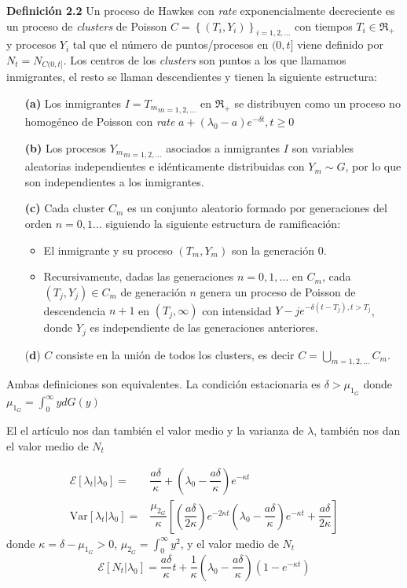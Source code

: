 \documentclass[a4paper,11pt]{book}
\begin{document}
\textbf{Definición 2.2} Un proceso de Hawkes con \textit{rate} exponencialmente decreciente es un proceso de \textit{clusters} de Poisson 
$C=\left\{ (T_i,Y_i) \right\}_{i=1,2,\ldots}$ con tiempos $T_i\in\Re_{+}$ y procesos $Y_i$ tal que el número de puntos/procesos en $(0,t]$ viene 
definido por $N_t=N_{C(0,t]}$. Los centros de los \textit{clusters} son puntos a los que llamamos inmigrantes, el resto se llaman descendientes y tienen 
la siguiente estructura:
\begin{itemize}
    \item[\textbf{(a)}] Los inmigrantes $I={T_m}_{m=1,2,\ldots}$ en $\Re_{+}$ se distribuyen como un proceso no homogéneo de Poisson con \textit{rate}
    $a+(\lambda_0-a)e^{-\delta t}, t\geq0$
    \item[\textbf{(b)}] Los procesos ${Y_m}_{m=1,2, \ldots }$ asociados a inmigrantes $I$ son variables aleatorias independientes e idénticamente
    distribuidas con $Y_m\sim G$, por lo que son independientes a los inmigrantes.
    \item[\textbf{(c)}] Cada cluster $C_m$ es un conjunto aleatorio formado por generaciones del orden $n=0,1\ldots$ siguiendo la siguiente estructura de 
    ramificación:
    \begin{itemize}
        \item El inmigrante y su proceso $(T_m,Y_m)$ son la generación 0.
        \item Recursivamente, dadas las generaciones $n=0,1,\ldots$ en $C_m$, cada $(T_j,Y_j)\in C_m$ de generación $n$ genera un proceso de Poisson de
        descendencia $n+1$ en $(T_j,\infty)$ con intensidad $Y-je^{-\delta(t-T_j),t>T_j}$, donde $Y_j$ es independiente de las generaciones anteriores.
    \end{itemize}
    \item[(\textbf{d})] $C$ consiste en la unión de todos los clusters, es decir $C=\bigcup_{m=1,2,\ldots}C_m$.
\end{itemize}

Ambas definiciones son equivalentes. La condición estacionaria es $\delta>\mu_{1_G}$ donde $\mu_{1_G}=\int_{0}^{\infty}ydG(y)$

El el artículo nos dan también el valor medio y la varianza de $\lambda$, también nos dan el valor medio de $N_t$

\begin{align*}
    \mathcal{E}[\lambda_t|\lambda_0] =& \dfrac{a\delta}{\kappa}+\left( \lambda_0-\dfrac{a\delta}{\kappa} \right)e^{-\kappa t}\\
    \text{Var}[\lambda_t|\lambda_0] =&  \dfrac{\mu_{2_G}}{\kappa}\left[ \left( \dfrac{a\delta}{2\kappa} \right)e^{-2\kappa t} 
    \left( \lambda_0-\dfrac{a\delta}{\kappa} \right)e^{-\kappa t}+\dfrac{a\delta}{2\kappa}\right]
\end{align*}
donde $\kappa=\delta-\mu_{1_G}>0$, $\mu_{2_G}=\int_{0}^{\infty}y^2$, y el valor medio de $N_t$ 
$$\mathcal{E}[N_t|\lambda_0]=\dfrac{a\delta}{\kappa}t+\dfrac{1}{\kappa}\left( \lambda_0-\dfrac{a\delta}{\kappa} \right)(1-e^{-\kappa t}) $$
\end{document}
